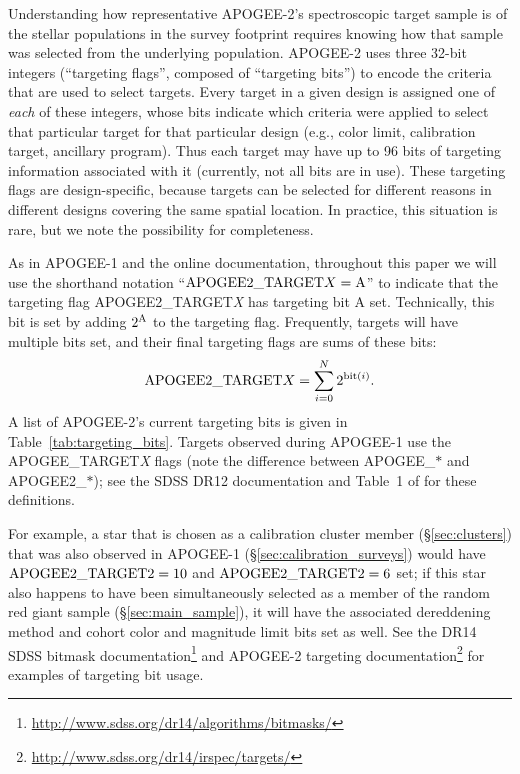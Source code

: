 \documentclass[12pt,twocolumn]{emulateapj}
\begin{document}
Understanding how representative APOGEE-2's spectroscopic target sample is 
of the stellar populations in the survey footprint requires knowing 
how that sample was selected from the underlying population.
APOGEE-2 uses three 32-bit integers (``targeting flags'', composed of ``targeting bits'')
to encode the criteria that are used to select targets.
Every target in a given design is assigned one of {\it each} of these integers,
whose bits indicate which criteria were applied to select that particular target 
for that particular design (e.g., color limit, calibration target, ancillary program).  
Thus each target may have up to 96 bits of targeting information associated with it (currently, not all bits are in use).
These targeting flags are design-specific, 
because targets can be selected for different reasons in different designs covering
the same spatial location.  
In practice, this situation is rare, but we note the possibility for completeness.

As in APOGEE-1 and the online documentation, throughout this paper we will use
the shorthand notation ``${\rm APOGEE2\_TARGET}X={\rm A}$'' to indicate that the targeting flag
APOGEE2\_TARGET{\it X} has targeting bit A set.  Technically, this bit is set by adding
$2^{\rm A}$ to the targeting flag.  Frequently, targets will have multiple bits set,
and their final targeting flags are sums of these bits:
\begin{equation}
{\rm APOGEE2\_TARGET}X = \sum_{i=0}^{N}{2^{{\rm bit}(i)}}.
\end{equation}
A list of APOGEE-2's current targeting bits is given in Table~\ref{tab:targeting_bits}.  Targets observed during APOGEE-1 use the APOGEE\_TARGET{\it X} flags (note the difference between APOGEE\_$\ast$ and APOGEE2\_$\ast$); see the SDSS DR12 documentation and Table~1 of \citet{Zasowski_2013_apogeetargeting} for these definitions.

For example, a star that is chosen as a calibration cluster member (\S\ref{sec:clusters}) that was also
observed in APOGEE-1 (\S\ref{sec:calibration_surveys}) would have ${\rm APOGEE2\_TARGET2=10}$ and ${\rm APOGEE2\_TARGET2=6}$ set;
if this star also happens to have been simultaneously selected as a member of the random
red giant sample (\S\ref{sec:main_sample}), it will have the associated dereddening method and 
cohort color and magnitude limit bits set as well.  See the DR14 SDSS bitmask documentation\footnote{\url{http://www.sdss.org/dr14/algorithms/bitmasks/}} and APOGEE-2 targeting documentation\footnote{\url{http://www.sdss.org/dr14/irspec/targets/}} for examples of targeting bit usage.
\end{document}

